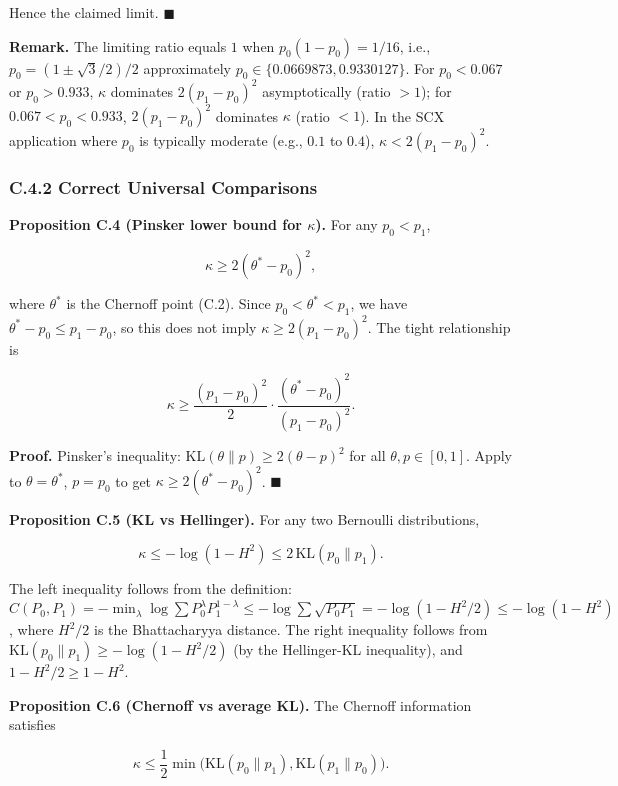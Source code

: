 \documentclass[
  12pt,
]{ctexart}
\begin{document}
Hence the claimed limit. \(\blacksquare\)

\textbf{Remark.} The limiting ratio equals \(1\) when
\(p_0(1-p_0) = 1/16\), i.e., \(p_0 = (1\pm\sqrt{3}/2)/2\) approximately
\(p_0 \in \{0.0669873, 0.9330127\}\). For \(p_0 < 0.067\) or
\(p_0 > 0.933\), \(\kappa\) dominates \(2(p_1-p_0)^2\) asymptotically
(ratio \(>1\)); for \(0.067 < p_0 < 0.933\), \(2(p_1-p_0)^2\) dominates
\(\kappa\) (ratio \(<1\)). In the SCX application where \(p_0\) is
typically moderate (e.g., \(0.1\) to \(0.4\)),
\(\kappa < 2(p_1-p_0)^2\).

\subsubsection{C.4.2 Correct Universal
Comparisons}\label{c.4.2-correct-universal-comparisons}

\textbf{Proposition C.4 (Pinsker lower bound for \(\kappa\)).} For any
\(p_0 < p_1\),

\[
\kappa \geq 2(\theta^* - p_0)^2,
\]

where \(\theta^*\) is the Chernoff point (C.2). Since
\(p_0 < \theta^* < p_1\), we have \(\theta^* - p_0 \leq p_1 - p_0\), so
this does not imply \(\kappa \geq 2(p_1-p_0)^2\). The tight relationship
is

\[
\kappa \geq \frac{(p_1-p_0)^2}{2} \cdot \frac{(\theta^*-p_0)^2}{(p_1-p_0)^2}.
\]

\textbf{Proof.} Pinsker's inequality:
\(\text{KL}(\theta\|p) \geq 2(\theta-p)^2\) for all
\(\theta,p\in[0,1]\). Apply to \(\theta = \theta^*\), \(p = p_0\) to get
\(\kappa \geq 2(\theta^* - p_0)^2\). \(\blacksquare\)

\textbf{Proposition C.5 (KL vs Hellinger).} For any two Bernoulli
distributions,

\[
\kappa \leq -\log(1-H^2) \leq 2\,\text{KL}(p_0\|p_1).
\]

The left inequality follows from the definition:
\(C(P_0,P_1) = -\min_{\lambda}\log\sum P_0^\lambda P_1^{1-\lambda} \leq -\log\sum \sqrt{P_0 P_1} = -\log(1-H^2/2) \leq -\log(1-H^2)\),
where \(H^2/2\) is the Bhattacharyya distance. The right inequality
follows from \(\text{KL}(p_0\|p_1) \geq -\log(1-H^2/2)\) (by the
Hellinger-KL inequality), and \(1-H^2/2 \geq 1-H^2\).

\textbf{Proposition C.6 (Chernoff vs average KL).} The Chernoff
information satisfies

\[
\kappa \leq \frac{1}{2}\min\bigl(\text{KL}(p_0\|p_1), \text{KL}(p_1\|p_0)\bigr).
\]
\end{document}
